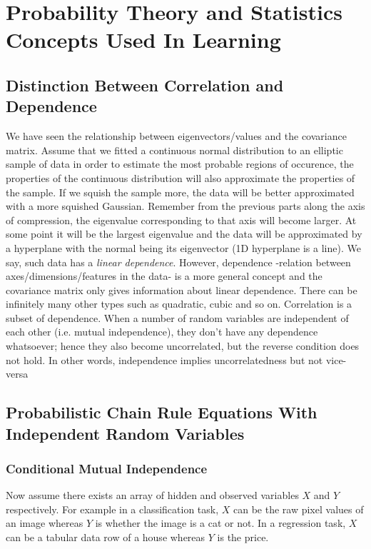 \documentclass{article}
\numberwithin{equation}{subsection}
\begin{document}
\section{Probability Theory and Statistics Concepts Used In Learning}
\subsection{Distinction Between Correlation and Dependence}
\label{cor_dep}
We have seen the relationship between eigenvectors/values and the covariance matrix. Assume that we fitted a continuous normal distribution to an elliptic
sample of data in order to estimate the most probable regions of occurence, the properties of the continuous distribution will also approximate the properties of the sample. If we squish the sample more, the data will be better approximated with a more squished Gaussian. Remember from the previous parts along the axis of compression, the eigenvalue corresponding to that axis will become larger. At some point it will be the largest eigenvalue and the data will be approximated by a hyperplane with the normal being its eigenvector (1D hyperplane is a line). We say, such data has a \textit{linear dependence}. However, dependence -relation between axes/dimensions/features in the data- is a more general concept and the covariance matrix only gives information about linear dependence. There can be infinitely many other types such as quadratic, cubic and so on. Correlation is a subset of dependence. When a number of random variables are independent of each other (i.e. mutual independence), they don't have any dependence whatsoever; hence they also become uncorrelated, but the reverse condition does not hold. In other words, independence implies uncorrelatedness but not vice-versa
\subsection{Probabilistic Chain Rule Equations With Independent Random Variables}
\subsubsection{Conditional Mutual Independence}
\label{cond_mutual_independence}
Now assume there exists an array of hidden and observed variables $X$ and $Y$ respectively. For example in a classification task, $X$ can be the raw pixel values of an image whereas $Y$ is whether the image is a cat or not. In a regression task, $X$ can be a tabular data row of a house whereas $Y$ is the price. 
\end{document}
